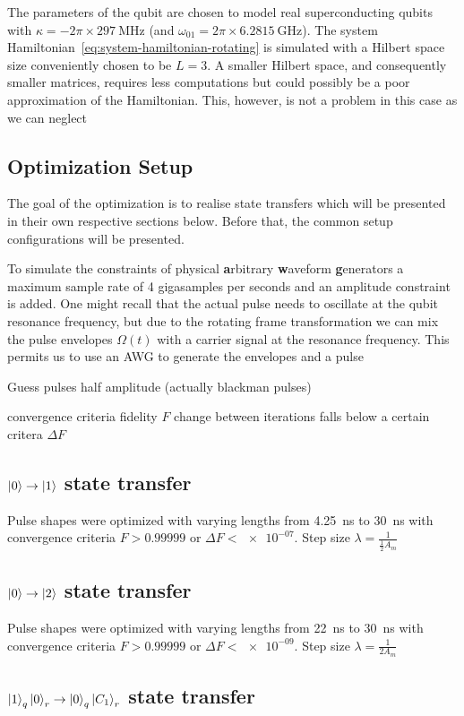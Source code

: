 \documentclass[main.tex]{subfiles}
\begin{document}
The parameters of the qubit are chosen to model real superconducting qubits with \( \kappa = -2\pi\times\SI{297}{\mega\hertz} \) (and \( \omega_{01} = 2\pi\times\SI{6.2815}{\giga\hertz} \)).
The system Hamiltonian~\eqref{eq:system-hamiltonian-rotating} is simulated with a Hilbert space size conveniently chosen to be \( L = 3 \).
A smaller Hilbert space, and consequently smaller matrices, requires less computations but could possibly be a poor approximation of the Hamiltonian.
This, however, is not a problem in this case as we can neglect %

\subsection{Optimization Setup}
The goal of the optimization is to realise state transfers which will be presented in their own respective sections below.
Before that, the common setup configurations will be presented.




To simulate the constraints of physical \textbf{a}rbitrary \textbf{w}aveform \textbf{g}enerators a maximum sample rate of 4 gigasamples per seconds and an amplitude constraint is added.
One might recall that the actual pulse needs to oscillate at the qubit resonance frequency, but due to the rotating frame transformation we can mix the pulse envelopes \( \Omega(t) \) with a carrier signal at the resonance frequency.
This permits us to use an AWG to generate the envelopes and a pulse 


Guess pulses half amplitude (actually blackman pulses)

convergence criteria
fidelity \(F\)
change between iterations falls below a certain critera \(\Delta F\)

\subsection{\texorpdfstring{\boldmath\(\ket{0}\rightarrow\ket{1}\)}{0 -> 1} state transfer}
Pulse shapes were optimized with varying lengths from \SI{4.25}{\nano\second} to \SI{30}{\nano\second} with convergence criteria \(F>0.99999\) or \(\Delta F < \num{e-07}\). Step size \(\lambda = \frac{1}{\frac{1}{2}A_{m}}\)

\subsection{\texorpdfstring{\boldmath\(\ket{0}\rightarrow\ket{2}\)}{0 -> 2} state transfer}
Pulse shapes were optimized with varying lengths from \SI{22}{\nano\second} to \SI{30}{\nano\second} with convergence criteria \(F>0.99999\) or \(\Delta F < \num{e-09}\). Step size \(\lambda = \frac{1}{2A_{m}}\)

\subsection{\texorpdfstring{\boldmath\( \ket{1}_q\ket{0}_r\rightarrow\ket{0}_q\ket{C_1}_r \)}{10 -> 0C1} state transfer}
\end{document}
